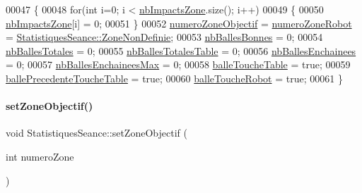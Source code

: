 \begin{DoxyCode}
00047 \{
00048     \textcolor{keywordflow}{for}(\textcolor{keywordtype}{int} i=0; i < \hyperlink{class_statistiques_seance_aa4a040cda282d5b1c250025f8e191e20}{nbImpactsZone}.size(); i++)
00049     \{
00050         \hyperlink{class_statistiques_seance_aa4a040cda282d5b1c250025f8e191e20}{nbImpactsZone}[i] = 0;
00051     \}
00052     \hyperlink{class_statistiques_seance_a23226867e4a34cb41f8c07f3d8d42e49}{numeroZoneObjectif} = \hyperlink{class_statistiques_seance_aeea50e7fc9b2308e365f77f27e3f86ee}{numeroZoneRobot} = 
      \hyperlink{class_statistiques_seance_aa839f5192cbadd7c3fb3651d62eff8b5afaee4b0051f413cbba9651905daeba28}{StatistiquesSeance::ZoneNonDefinie};
00053     \hyperlink{class_statistiques_seance_af62043be598fd6b7cd7ddbc37eadf967}{nbBallesBonnes} = 0;
00054     \hyperlink{class_statistiques_seance_a27eb3965bbe304700d3254534c5e4ed3}{nbBallesTotales} = 0;
00055     \hyperlink{class_statistiques_seance_aa152a6f154cc832c3355342ecf94162a}{nbBallesTotalesTable} = 0;
00056     \hyperlink{class_statistiques_seance_ac7f71fc7b017bb17d4576f954120c7a0}{nbBallesEnchainees} = 0;
00057     \hyperlink{class_statistiques_seance_a3e64397e87d453efb42b2545df1a8e90}{nbBallesEnchaineesMax} = 0;
00058     \hyperlink{class_statistiques_seance_ad428a6da4f5615a7682c8fa4fb597ce3}{balleToucheTable} = \textcolor{keyword}{true};
00059     \hyperlink{class_statistiques_seance_a36681be0a5a9fc48c4c332606a0418ad}{ballePrecedenteToucheTable} = \textcolor{keyword}{true};
00060     \hyperlink{class_statistiques_seance_af6747af0965a82d7d59a248682bbb575}{balleToucheRobot} = \textcolor{keyword}{true};
00061 \}
\end{DoxyCode}
\mbox{\label{class_statistiques_seance_af7c8281e195c0822463e6747bd0695ef}} 
\paragraph{\texorpdfstring{set\+Zone\+Objectif()}{setZoneObjectif()}}
{\footnotesize\ttfamily void Statistiques\+Seance\+::set\+Zone\+Objectif (\begin{DoxyParamCaption}\item[{int}]{numero\+Zone }\end{DoxyParamCaption})}



